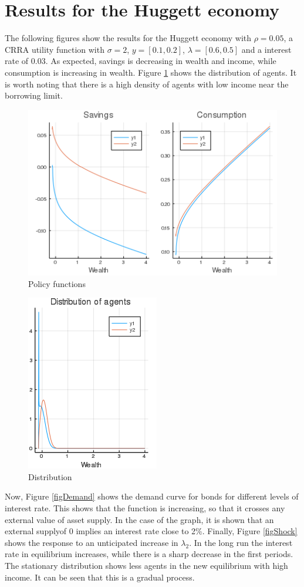 \documentclass[12pt]{article}
\begin{document}
\section{Results for the Huggett economy}
The following figures show the results for the Huggett economy with $\rho=0.05$, a CRRA utility function with $\sigma=2$, $y=[0.1, 0.2]$, $\lambda=[0.6,0.5]$ and a interest rate of 0.03. As expected, savings is decreasing in wealth and income, while consumption is increasing in wealth. Figure \ref{figDist} shows the distribution of agents. It is worth noting that there is a high density of agents with low income near the borrowing limit.
\begin{figure}
\center
\includegraphics{HuggettPolicies.png} \caption{Policy functions}
\end{figure}

\begin{figure}
\center
\includegraphics{HuggettDistribution.png} \caption{Distribution}\label{figDist}
\end{figure}

Now, Figure \ref{figDemand} shows the demand curve for bonds for different levels of interest rate. This shows that the function is increasing, so that it crosses any external value of asset supply. In the case of the graph, it is shown that an external supplyof 0 implies an interest rate close to 2\%. Finally, Figure \ref{figShock} shows the response to an unticipated increase in $\lambda_2$. In the long run the interest rate in equilibrium increases, while there is a sharp decrease in the first periods. The stationary distribution shows less agents in the new equilibrium with high income. It can be seen that this is a gradual process.
\end{document}
